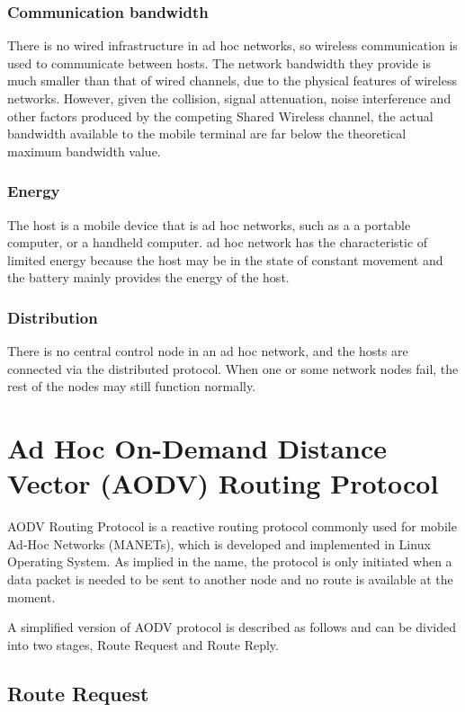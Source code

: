 \subsubsection{Communication bandwidth}
There is no wired infrastructure in ad hoc networks, so wireless communication is used to communicate between hosts. The network bandwidth they provide is much smaller than that of wired channels, due to the physical features of wireless networks. However, given the collision, signal attenuation, noise interference and other factors produced by the competing Shared Wireless channel, the actual bandwidth available to the mobile terminal are far below the theoretical maximum bandwidth value.

\subsubsection{Energy}
The host is a mobile device that is ad hoc networks, such as a a portable computer, or a handheld computer. ad hoc network has the characteristic of limited energy because the host may be in the state of constant movement and the battery mainly provides the energy of the host.

\subsubsection{Distribution}
There is no central control node in an ad hoc network, and the hosts are connected via the distributed protocol. When one or some network nodes fail, the rest of the nodes may still function normally.


\section{Ad Hoc On-Demand Distance Vector (AODV) Routing Protocol}

AODV Routing Protocol \citep{rfc3561} is a reactive routing protocol commonly used for mobile Ad-Hoc Networks (MANETs), which is developed and implemented in Linux Operating System.
As implied in the name, the protocol is only initiated  when a data packet is needed to be sent to another node and no route is available at the moment.

A simplified version of AODV protocol is described as follows and can be divided into two stages, Route Request and Route Reply.

\subsection{Route Request}

